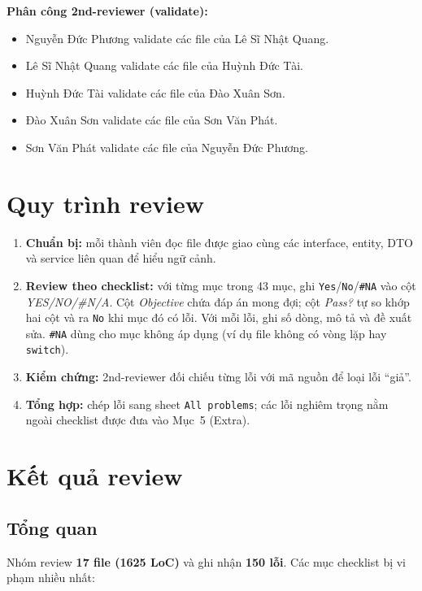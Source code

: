 \documentclass[12pt,a4paper]{article}
\begin{document}
\noindent\textbf{Phân công 2nd-reviewer (validate):}
\begin{itemize}[noitemsep]
  \item Nguyễn Đức Phương validate các file của Lê Sĩ Nhật Quang.
  \item Lê Sĩ Nhật Quang validate các file của Huỳnh Đức Tài.
  \item Huỳnh Đức Tài validate các file của Đào Xuân Sơn.
  \item Đào Xuân Sơn validate các file của Sơn Văn Phát.
  \item Sơn Văn Phát validate các file của Nguyễn Đức Phương.
\end{itemize}

\section{Quy trình review}
\begin{enumerate}[noitemsep]
  \item \textbf{Chuẩn bị:} mỗi thành viên đọc file được giao cùng các interface, entity, DTO và service
        liên quan để hiểu ngữ cảnh.
  \item \textbf{Review theo checklist:} với từng mục trong 43 mục, ghi \texttt{Yes}/\texttt{No}/\texttt{\#NA} vào cột
        \textit{YES/NO/\#N/A}. Cột \textit{Objective} chứa đáp án mong đợi; cột \textit{Pass?} tự so khớp hai cột
        và ra \texttt{No} khi mục đó có lỗi. Với mỗi lỗi, ghi số dòng, mô tả và đề xuất sửa.
        \texttt{\#NA} dùng cho mục không áp dụng (ví dụ file không có vòng lặp hay \texttt{switch}).
  \item \textbf{Kiểm chứng:} 2nd-reviewer đối chiếu từng lỗi với mã nguồn để loại lỗi ``giả''.
  \item \textbf{Tổng hợp:} chép lỗi sang sheet \texttt{All problems}; các lỗi nghiêm trọng nằm ngoài checklist
        được đưa vào Mục~5 (Extra).
\end{enumerate}

\section{Kết quả review}

\subsection{Tổng quan}
Nhóm review \textbf{17 file (1625 LoC)} và ghi nhận \textbf{150 lỗi}. Các mục checklist bị vi phạm nhiều nhất:
\end{document}
